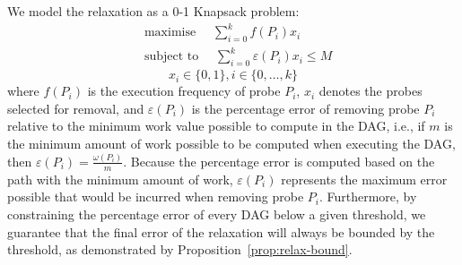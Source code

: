 \documentclass[sigplan,10pt]{acmart}
\theoremstyle{definition}
\begin{document}
We model the relaxation as a 0-1 Knapsack problem:
\begin{equation*}
\begin{aligned}
& \textrm{maximise }\quad \sum_{i=0}^{k} f(P_i)x_i \\
& \textrm{subject to }\quad \sum_{i=0}^{k} \varepsilon(P_i)x_i \leq M
\end{aligned}
\end{equation*}
\[
x_i\in\{0,1\}, i\in\{0,\ldots,k\}
\]
where $f(P_i)$ is the execution frequency of probe $P_i$, $x_i$ denotes the probes selected for removal, and $\varepsilon(P_i)$ is the percentage error of removing probe $P_i$ relative to the minimum work value possible to compute in the DAG, i.e., if $m$ is the minimum amount of work possible to be computed when executing the DAG, then $\varepsilon(P_i) = \frac{\omega(P_i)}{m}$.
Because the percentage error is computed based on the path with the minimum amount of work, $\varepsilon(P_i)$ represents the maximum error possible that would be incurred when removing probe $P_i$.
Furthermore, by constraining the percentage error of every DAG below a given threshold, we guarantee that the final error of the relaxation will always be bounded by the threshold, as demonstrated by Proposition~\ref{prop:relax-bound}.
\end{document}
